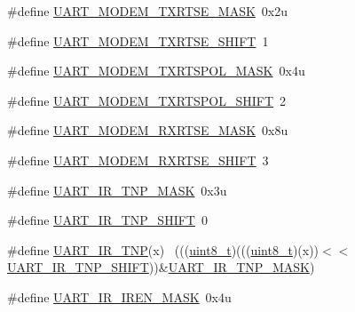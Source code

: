 \begin{DoxyCompactItemize}
\item 
\#define \hyperlink{group___u_a_r_t___register___masks_gabcfa3a03c9114f74c35bb22c13261c1b}{U\+A\+R\+T\+\_\+\+M\+O\+D\+E\+M\+\_\+\+T\+X\+R\+T\+S\+E\+\_\+\+M\+A\+SK}~0x2u
\item 
\#define \hyperlink{group___u_a_r_t___register___masks_gadc29d3e7148a1f7a895a1db6442cc5b8}{U\+A\+R\+T\+\_\+\+M\+O\+D\+E\+M\+\_\+\+T\+X\+R\+T\+S\+E\+\_\+\+S\+H\+I\+FT}~1
\item 
\#define \hyperlink{group___u_a_r_t___register___masks_ga83617aa9166494f2dbed5da69b5ae0ef}{U\+A\+R\+T\+\_\+\+M\+O\+D\+E\+M\+\_\+\+T\+X\+R\+T\+S\+P\+O\+L\+\_\+\+M\+A\+SK}~0x4u
\item 
\#define \hyperlink{group___u_a_r_t___register___masks_ga3b069f2bfe05099b3fdb47e872c6b2e6}{U\+A\+R\+T\+\_\+\+M\+O\+D\+E\+M\+\_\+\+T\+X\+R\+T\+S\+P\+O\+L\+\_\+\+S\+H\+I\+FT}~2
\item 
\#define \hyperlink{group___u_a_r_t___register___masks_gaceb719e6bb4624e1b8a5a922bd594778}{U\+A\+R\+T\+\_\+\+M\+O\+D\+E\+M\+\_\+\+R\+X\+R\+T\+S\+E\+\_\+\+M\+A\+SK}~0x8u
\item 
\#define \hyperlink{group___u_a_r_t___register___masks_gabbe55b53dd5c048084d8c9341e522d90}{U\+A\+R\+T\+\_\+\+M\+O\+D\+E\+M\+\_\+\+R\+X\+R\+T\+S\+E\+\_\+\+S\+H\+I\+FT}~3
\item 
\#define \hyperlink{group___u_a_r_t___register___masks_ga635e77629e602b47032f8d35dda0f442}{U\+A\+R\+T\+\_\+\+I\+R\+\_\+\+T\+N\+P\+\_\+\+M\+A\+SK}~0x3u
\item 
\#define \hyperlink{group___u_a_r_t___register___masks_gafc08f087483347c37c3051f6c86d2beb}{U\+A\+R\+T\+\_\+\+I\+R\+\_\+\+T\+N\+P\+\_\+\+S\+H\+I\+FT}~0
\item 
\#define \hyperlink{group___u_a_r_t___register___masks_ga0b1313b20737a0cc2211c37b6627cead}{U\+A\+R\+T\+\_\+\+I\+R\+\_\+\+T\+NP}(x)                                                  ~(((\hyperlink{_p_e___types_8h_aba7bc1797add20fe3efdf37ced1182c5}{uint8\+\_\+t})(((\hyperlink{_p_e___types_8h_aba7bc1797add20fe3efdf37ced1182c5}{uint8\+\_\+t})(x))$<$$<$\hyperlink{group___u_a_r_t___register___masks_gafc08f087483347c37c3051f6c86d2beb}{U\+A\+R\+T\+\_\+\+I\+R\+\_\+\+T\+N\+P\+\_\+\+S\+H\+I\+FT}))\&\hyperlink{group___u_a_r_t___register___masks_ga635e77629e602b47032f8d35dda0f442}{U\+A\+R\+T\+\_\+\+I\+R\+\_\+\+T\+N\+P\+\_\+\+M\+A\+SK})
\item 
\#define \hyperlink{group___u_a_r_t___register___masks_gafb25f2545b505763066c9f30ff7447f0}{U\+A\+R\+T\+\_\+\+I\+R\+\_\+\+I\+R\+E\+N\+\_\+\+M\+A\+SK}~0x4u
\item 
$$
\end{DoxyCompactItemize}
